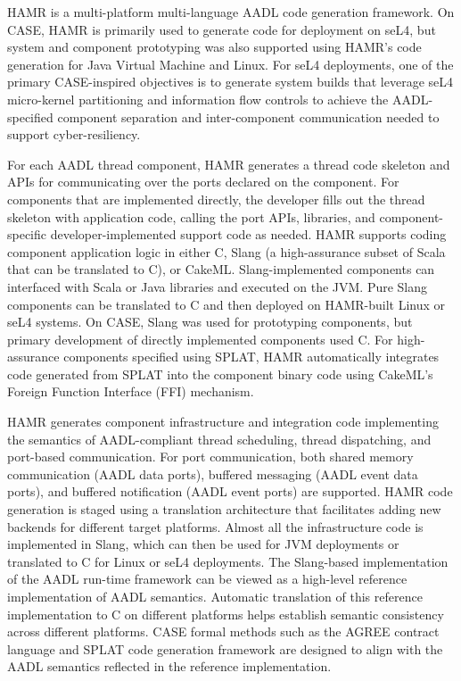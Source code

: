 
HAMR \cite{Hatcliff-al:ISOLA21} is a multi-platform multi-language AADL code generation framework.  On CASE, HAMR is primarily used to generate code for deployment on seL4, but system and component prototyping was also supported using HAMR's code generation for Java Virtual Machine and Linux.  For seL4 deployments, one of the primary CASE-inspired objectives is to generate system builds that leverage seL4 micro-kernel partitioning and information flow controls to achieve the AADL-specified component separation and inter-component communication needed to support cyber-resiliency.

For each AADL thread component, HAMR generates a thread code skeleton and APIs for communicating over the ports declared on the component.  For components that are implemented directly, the developer fills out the thread skeleton with application code, calling the port APIs, libraries, and component-specific developer-implemented support code as needed.  HAMR supports coding component application logic in either C, Slang (a high-assurance subset of Scala that can be translated to C), or CakeML.  Slang-implemented components can interfaced with Scala or Java libraries and executed on the JVM.  Pure Slang components can be translated to C and then deployed on HAMR-built Linux or seL4 systems.  On CASE, Slang was used for prototyping components, but primary development of directly implemented components used C.  For high-assurance components specified using SPLAT, HAMR automatically integrates code generated from SPLAT into the component binary code using CakeML's Foreign Function Interface (FFI) mechanism.

HAMR generates component infrastructure and integration code implementing the semantics of AADL-compliant thread scheduling, thread dispatching, and port-based communication.  For port communication, both shared memory communication (AADL data ports), buffered messaging (AADL event data ports), and buffered notification (AADL event ports) are supported.  HAMR code generation is staged using a translation architecture that facilitates adding new backends for different target platforms.   Almost all the infrastructure code is implemented in Slang, which can then be used for JVM deployments or translated to C for Linux or seL4 deployments.  The Slang-based implementation of the AADL run-time framework can be viewed as a high-level reference implementation of AADL semantics.   Automatic translation of this reference implementation to C on different platforms helps establish semantic consistency across different platforms.    CASE formal methods such as the AGREE contract language and SPLAT code generation framework are designed to align with the AADL semantics reflected in the reference implementation.  

